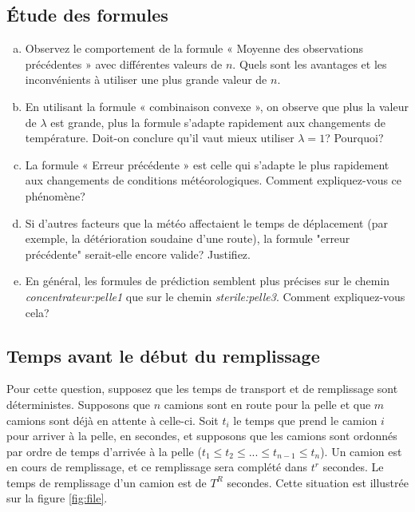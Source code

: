 	
	
	
	
	
	\subsection{Étude des formules}
	\label{sec:pred:etude}
	\begin{enumerate}[a)]
		\item Observez le comportement de la formule « Moyenne des observations précédentes » avec différentes valeurs de $n$. Quels sont les avantages et les inconvénients à utiliser une plus grande valeur de $n$. 
		\item En utilisant la formule « combinaison convexe », on observe que plus la valeur de $\lambda$ est grande, plus la formule s’adapte rapidement aux changements de température. Doit-on conclure qu’il vaut mieux utiliser $\lambda=1$? Pourquoi?
		\item La formule « Erreur précédente » est celle qui s’adapte le plus rapidement aux changements de conditions météorologiques. Comment expliquez-vous ce phénomène? 
		\item Si d’autres facteurs que la météo affectaient le temps de déplacement (par exemple, la détérioration soudaine d'une route), la formule "erreur précédente" serait-elle encore valide? Justifiez.
		\item En général, les formules de prédiction semblent plus précises sur le chemin \textit{concentrateur:pelle1} que sur le chemin \textit{sterile:pelle3}. Comment expliquez-vous cela?	
	\end{enumerate}

	
	\subsection{Temps avant le début du remplissage}
	
	Pour cette question, supposez que les temps de transport et de remplissage sont déterministes. Supposons que $n$ camions sont en route pour la pelle et que $m$ camions sont déjà en attente à celle-ci. Soit $t_i$ le temps que prend le camion $i$ pour arriver à la pelle, en secondes, et supposons que les camions sont ordonnés par ordre de temps d'arrivée à la pelle ($t_1 \leq t_2 \leq ...\leq t_{n-1} \leq t_n$). Un camion est en cours de remplissage, et ce remplissage sera complété dans $t^r$ secondes. Le temps de remplissage d'un camion est de $T^R$ secondes. Cette situation est illustrée sur la figure \ref{fig:file}.
	
